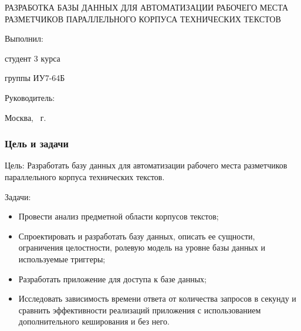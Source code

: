 \documentclass{beamer}
\begin{document}
\begingroup
{}

\begin{frame}
\begin{center}
\Large РАЗРАБОТКА БАЗЫ ДАННЫХ ДЛЯ АВТОМАТИЗАЦИИ РАБОЧЕГО МЕСТА РАЗМЕТЧИКОВ ПАРАЛЛЕЛЬНОГО КОРПУСА ТЕХНИЧЕСКИХ ТЕКСТОВ
\end{center}

\vfill

\begin{minipage}[t]{0.45\textwidth}
    \raggedright
    Выполнил:

    студент 3 курса

    группы ИУ7-64Б

\end{minipage}
\hfill
\begin{minipage}[t]{0.45\textwidth}
    \raggedleft
    Руководитель:

\end{minipage}

\vfill

\begin{center}
    Москва, \the\year\ г.
\end{center}
\end{frame}
\endgroup

\begin{frame}
    \frametitle{Цель и задачи}
    Цель: Разработать базу данных для автоматизации рабочего места разметчиков параллельного корпуса технических текстов.

    \vfill

    Задачи:
    \begin{itemize}
        \item Провести анализ предметной области корпусов текстов;
        \item Спроектировать и разработать базу данных, описать ее сущности, ограничения целостности, ролевую модель на уровне базы данных и используемые триггеры;
        \item Разработать приложение для доступа к базе данных;
        \item Исследовать зависимость времени ответа от количества запросов в секунду и сравнить эффективности реализаций приложения с использованием дополнительного кеширования и без него.
    \end{itemize}
\end{frame}
\end{document}
